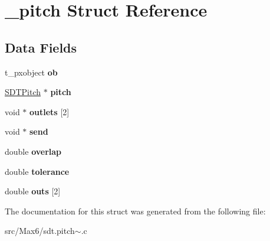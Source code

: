 \hypertarget{struct__pitch}{}\section{\+\_\+pitch Struct Reference}
\label{struct__pitch}
\subsection*{Data Fields}
\begin{DoxyCompactItemize}
\item 
\hypertarget{struct__pitch_a55b4380edb216f04a1c42b9095594963}{}t\+\_\+pxobject {\bfseries ob}\label{struct__pitch_a55b4380edb216f04a1c42b9095594963}

\item 
\hypertarget{struct__pitch_a6da49e238dac838ff0e63ead66a90535}{}\hyperlink{struct_s_d_t_pitch}{S\+D\+T\+Pitch} $\ast$ {\bfseries pitch}\label{struct__pitch_a6da49e238dac838ff0e63ead66a90535}

\item 
\hypertarget{struct__pitch_a1f0319603dc2b6595b9301c91c04b7c4}{}void $\ast$ {\bfseries outlets} \mbox{[}2\mbox{]}\label{struct__pitch_a1f0319603dc2b6595b9301c91c04b7c4}

\item 
\hypertarget{struct__pitch_ab82783be31120644484d68f0f0f03615}{}void $\ast$ {\bfseries send}\label{struct__pitch_ab82783be31120644484d68f0f0f03615}

\item 
\hypertarget{struct__pitch_aeb5a494cce1f67b74810ff267f256b9c}{}double {\bfseries overlap}\label{struct__pitch_aeb5a494cce1f67b74810ff267f256b9c}

\item 
\hypertarget{struct__pitch_a97eab6d709b80585fe9e8a54b1e3da27}{}double {\bfseries tolerance}\label{struct__pitch_a97eab6d709b80585fe9e8a54b1e3da27}

\item 
\hypertarget{struct__pitch_aa2d92c35a59dae15e65523e08900b222}{}double {\bfseries outs} \mbox{[}2\mbox{]}\label{struct__pitch_aa2d92c35a59dae15e65523e08900b222}

\end{DoxyCompactItemize}


The documentation for this struct was generated from the following file\+:\begin{DoxyCompactItemize}
\item 
src/\+Max6/sdt.\+pitch$\sim$.\+c\end{DoxyCompactItemize}
